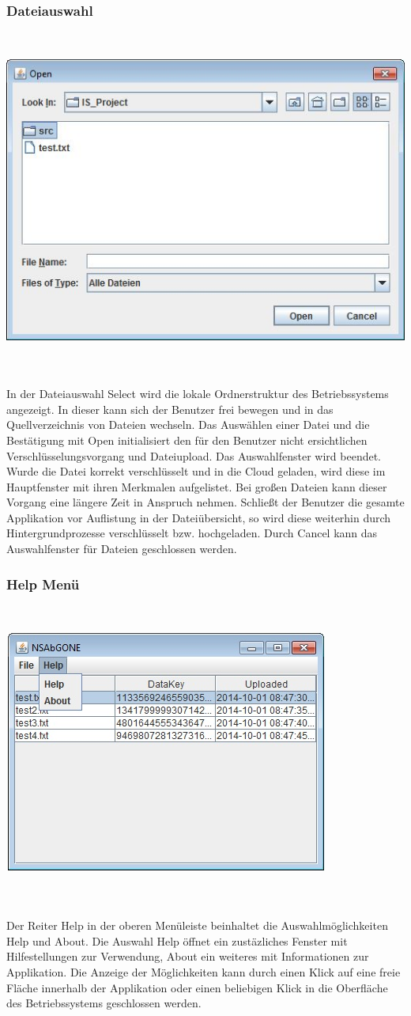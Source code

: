 \documentclass[13pt,a4paper,bibliography=totocnumbered,listof=totocnumbered]{scrartcl}
\begin{document}
\subsubsection{Dateiauswahl}
$\;$\\
\begin{minipage}{\linewidth}
	\centering
	\includegraphics[width=0.4\linewidth]{./img/Select.jpg}
	\label{Select}
\end{minipage}
\\\\In der Dateiauswahl Select wird die lokale Ordnerstruktur des Betriebssystems angezeigt. In dieser kann sich der Benutzer frei bewegen und in das Quellverzeichnis von Dateien wechseln. Das Auswählen einer Datei und die Bestätigung mit Open initialisiert den für den Benutzer nicht ersichtlichen Verschlüsselungsvorgang und Dateiupload. Das Auswahlfenster wird beendet. Wurde die Datei korrekt verschlüsselt und in die Cloud geladen, wird diese im Hauptfenster mit ihren Merkmalen aufgelistet. Bei großen Dateien kann dieser Vorgang eine längere Zeit in Anspruch nehmen. Schließt der Benutzer die gesamte Applikation vor Auflistung in der Dateiübersicht, so wird diese weiterhin durch Hintergrundprozesse verschlüsselt bzw. hochgeladen. Durch Cancel kann das Auswahlfenster für Dateien geschlossen werden.

\subsubsection{Help Menü}
$\;$\\
\begin{minipage}{\linewidth}
	\centering
	\includegraphics[width=0.4\linewidth]{./img/Help.jpg}
	\label{Help}
\end{minipage}
\\\\Der Reiter Help in der oberen Menüleiste beinhaltet die Auswahlmöglichkeiten Help und About. Die Auswahl Help öffnet ein zustäzliches Fenster mit Hilfestellungen zur Verwendung, About ein weiteres mit Informationen zur Applikation. Die Anzeige der Möglichkeiten kann durch einen Klick auf eine freie Fläche innerhalb der Applikation oder einen beliebigen Klick in die Oberfläche des Betriebssystems geschlossen werden.
\end{document}

